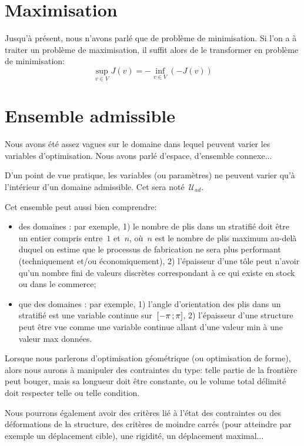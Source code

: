 \section{Maximisation}

Jusqu'à présent, nous n'avons parlé que de problème de minimisation.
Si l'on a à traiter un problème de maximisation, il suffit alors de le transformer en problème de minimisation:
\begin{equation}
\sup_{v\in V} J(v)=-\inf_{v\in V} (-J(v))
\end{equation}

\medskip
\section{Ensemble admissible}

Nous avons été assez vagues sur le domaine dans lequel peuvent varier les variables d'optimisation. Nous avons parlé d'espace, d'ensemble connexe...

D'un point de vue pratique, les variables (ou paramètres) ne peuvent varier qu'à l'intérieur d'un domaine admissible. Cet  sera noté~$\mathcal{U}_{ad}$.

\medskip
Cet ensemble peut aussi bien comprendre:
\begin{itemize}
   \item des domaines : par exemple, 1) le nombre de plis dans un stratifié doit être un entier compris entre~$1$ et~$n$, où~$n$ est le nombre de plis maximum au-delà duquel on estime que le processus de fabrication ne sera plus performant (techniquement et/ou économiquement), 2) l'épaisseur d'une tôle peut n'avoir qu'un nombre fini de valeurs discrètes correspondant à ce qui existe en stock ou dans le commerce;
   \item que des domaines : par exemple, 1) l'angle d'orientation des plis dans un stratifié est une variable continue sur~$\mathopen{[}-\pi\,;\pi\mathclose{]}$, 2) l'épaisseur d'une structure peut être vue comme une variable continue allant d'une valeur min à une valeur max données.
\end{itemize}

Lorsque nous parlerons d'optimisation géométrique (ou optimisation de forme), alors nous aurons à manipuler des contraintes du type: telle partie de la frontière peut bouger, mais sa longueur doit être constante, ou le volume total délimité doit respecter telle ou telle condition.

Nous pourrons également avoir des critères lié à l'état des contraintes ou des déformations de la structure, des critères de moindre carrés (pour atteindre par exemple un déplacement cible), une rigidité, un déplacement maximal...

